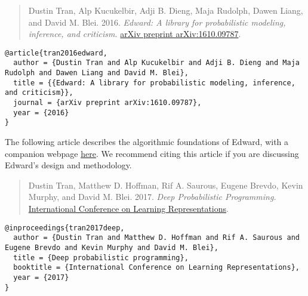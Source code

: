 \begin{quote}
Dustin Tran, Alp Kucukelbir, Adji B. Dieng, Maja Rudolph, Dawen Liang,
and David M. Blei.
2016.
\emph{Edward: A library for probabilistic modeling, inference, and criticism.}
\href{https://arxiv.org/abs/1610.09787}{arXiv preprint arXiv:1610.09787}.
\end{quote}

\begin{lstlisting}[class=JSON]
@article{tran2016edward,
  author = {Dustin Tran and Alp Kucukelbir and Adji B. Dieng and Maja Rudolph and Dawen Liang and David M. Blei},
  title = {{Edward: A library for probabilistic modeling, inference, and criticism}},
  journal = {arXiv preprint arXiv:1610.09787},
  year = {2016}
}
\end{lstlisting}

The following article describes the algorithmic foundations of Edward,
with a companion webpage \href{/iclr2017}{here}.
We recommend citing this article if you are discussing Edward's
design and methodology.

\begin{quote}
Dustin Tran, Matthew D. Hoffman, Rif A. Saurous, Eugene Brevdo, Kevin
Murphy, and David M. Blei.
2017.
\emph{Deep Probabilistic Programming.}
\href{https://arxiv.org/abs/1701.03757}{International Conference on Learning Representations}.
\end{quote}

\begin{lstlisting}[class=JSON]
@inproceedings{tran2017deep,
  author = {Dustin Tran and Matthew D. Hoffman and Rif A. Saurous and Eugene Brevdo and Kevin Murphy and David M. Blei},
  title = {Deep probabilistic programming},
  booktitle = {International Conference on Learning Representations},
  year = {2017}
}
\end{lstlisting}
